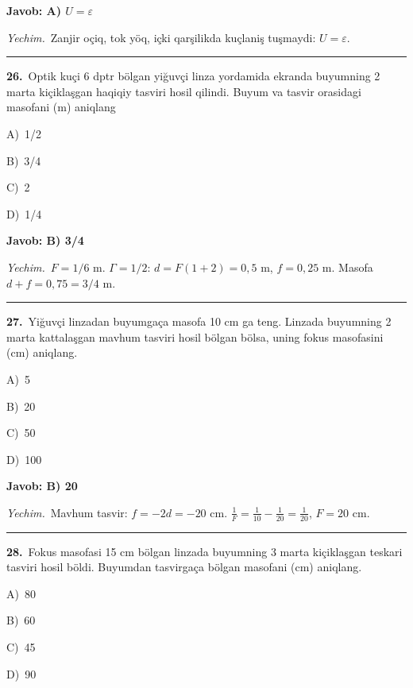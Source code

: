 \documentclass[11pt,a4paper]{article}
\newcommand{\opt}[2]{\hspace*{4mm}#1)\ #2\par}
\begin{document}
\noindent\colorbox{gray!12}{\parbox{\dimexpr\linewidth-2\fboxsep}{\textbf{Javob: A) $U=\varepsilon$}}}\par\smallskip
\noindent\textit{Yechim.}\ Zanjir oçiq, tok yöq, içki qarşilikda kuçlaniş tuşmaydi: $U=\varepsilon$.\par\par\medskip\hrule\medskip
{}\noindent\begin{minipage}{\linewidth}
\textbf{26.}\ Optik kuçi 6 dptr bölgan yiğuvçi linza yordamida ekranda buyumning 2 marta kiçiklaşgan haqiqiy tasviri hosil qilindi. Buyum va tasvir orasidagi masofani (m) aniqlang\par\smallskip
\opt{A}{1/2}
\opt{B}{3/4}
\opt{C}{2}
\opt{D}{1/4}
\end{minipage}\vspace{2pt}\par
\noindent\colorbox{gray!12}{\parbox{\dimexpr\linewidth-2\fboxsep}{\textbf{Javob: B) 3/4}}}\par\smallskip
\noindent\textit{Yechim.}\ $F=1/6$ m. $\Gamma=1/2$: $d=F(1+2)=0{,}5$ m, $f=0{,}25$ m. Masofa $d+f=0{,}75=3/4$ m.\par\par\medskip\hrule\medskip
{}\noindent\begin{minipage}{\linewidth}
\textbf{27.}\ Yiğuvçi linzadan buyumgaça masofa 10 cm ga teng. Linzada buyumning 2 marta kattalaşgan mavhum tasviri hosil bölgan bölsa, uning fokus masofasini (cm) aniqlang.\par\smallskip
\opt{A}{5}
\opt{B}{20}
\opt{C}{50}
\opt{D}{100}
\end{minipage}\vspace{2pt}\par
\noindent\colorbox{gray!12}{\parbox{\dimexpr\linewidth-2\fboxsep}{\textbf{Javob: B) 20}}}\par\smallskip
\noindent\textit{Yechim.}\ Mavhum tasvir: $f=-2d=-20$ cm. $\frac1F=\frac1{10}-\frac1{20}=\frac1{20}$, $F=20$ cm.\par\par\medskip\hrule\medskip
{}\noindent\begin{minipage}{\linewidth}
\textbf{28.}\ Fokus masofasi 15 cm bölgan linzada buyumning 3 marta kiçiklaşgan teskari tasviri hosil böldi. Buyumdan tasvirgaça bölgan masofani (cm) aniqlang.\par\smallskip
\opt{A}{80}
\opt{B}{60}
\opt{C}{45}
\opt{D}{90}
\end{minipage}\vspace{2pt}\par
\end{document}
